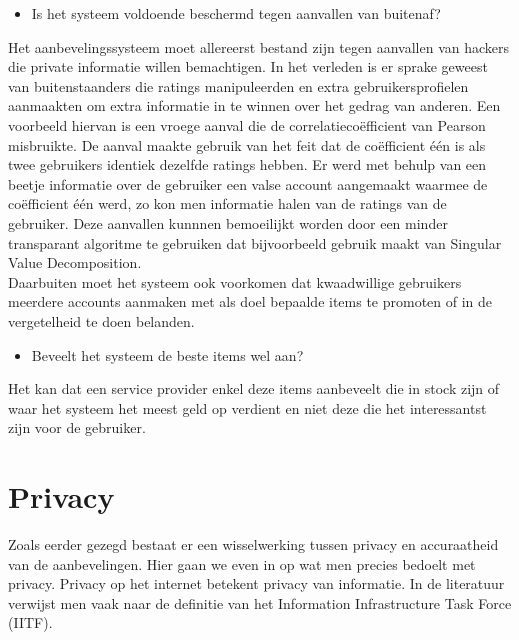 \begin{itemize}
 
\item Is het systeem voldoende beschermd tegen aanvallen van buitenaf?
\end{itemize}
 Het aanbevelingssysteem moet allereerst bestand zijn tegen aanvallen van hackers die private informatie willen bemachtigen. In het verleden is er sprake geweest van buitenstaanders die ratings manipuleerden en extra gebruikersprofielen aanmaakten om extra informatie in te winnen over het gedrag van anderen. Een voorbeeld hiervan is een vroege aanval die de correlatieco\"efficient van Pearson misbruikte. De aanval maakte gebruik van het feit dat de co\"efficient \'e\'en is als twee gebruikers identiek dezelfde ratings hebben. Er werd met behulp van een beetje informatie over de gebruiker een valse account aangemaakt waarmee de co\"efficient \'e\'en werd, zo kon men informatie halen van de ratings van de gebruiker.  Deze aanvallen kunnnen bemoeilijkt worden door een minder transparant algoritme te gebruiken dat bijvoorbeeld gebruik maakt van Singular Value Decomposition. \\Daarbuiten moet het systeem ook voorkomen dat kwaadwillige gebruikers meerdere accounts aanmaken met als doel bepaalde items te promoten of in de vergetelheid te doen belanden. 
 
 \begin{itemize}
\item Beveelt het systeem de beste items wel aan?
\end{itemize}
 
  Het kan dat een service provider enkel deze items aanbeveelt die in stock zijn of waar het systeem het meest geld op verdient en niet deze die het interessantst zijn voor de gebruiker. 
  
 
\section{Privacy}
\label{sec:privacy}
Zoals eerder gezegd bestaat er een wisselwerking tussen privacy en accuraatheid van de aanbevelingen. Hier gaan we even in op wat men precies bedoelt met privacy. Privacy op het internet betekent privacy van informatie. In de literatuur verwijst men vaak naar de definitie van het Information Infrastructure Task Force (IITF).

